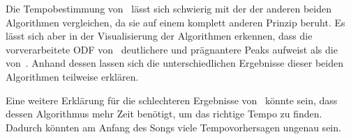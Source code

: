 {{		%
		Die Tempobestimmung von~\cite{2011_PlRoSt} lässt sich schwierig mit der der anderen beiden Algorithmen vergleichen,
			da sie auf einem komplett anderen Prinzip beruht.
		Es lässt sich aber in der Visualisierung der Algorithmen erkennen,
			dass die vorverarbeitete \ac{ODF} von~\cite{2009_DaPlSt} deutlichere und prägnantere Peaks aufweist
			als die von~\cite{2011_PlRoSt}.
		Anhand dessen lassen sich die unterschiedlichen Ergebnisse dieser beiden Algorithmen teilweise erklären.

		Eine weitere Erklärung für die schlechteren Ergebnisse von~\cite{2011_PlRoSt} könnte sein,
			dass dessen Algorithmus mehr Zeit benötigt,
			um das richtige Tempo zu finden.
		Dadurch könnten am Anfang des Songs viele Tempovorhersagen ungenau sein.
	}
}

